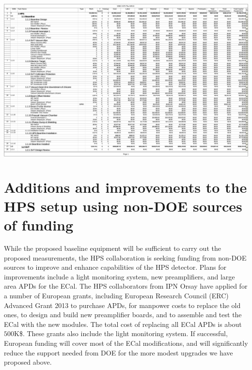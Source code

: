 \begin{center}
\includegraphics[page=9,angle=90,height=\textheight]{cost_schedule/HPSV470.pdf} 
\end{center}




\section{Additions and improvements to the HPS setup using non-DOE sources of funding}

While the proposed baseline equipment will be sufficient to carry out the proposed measurements, the HPS collaboration is 
seeking funding from non-DOE sources to improve and enhance capabilities of the HPS detector. Plans for improvements 
include a light monitoring system, new preamplifiers, and large area APDs for the ECal. The HPS collaborators from IPN Orsay have applied for 
a number of European grants, including European Research Council (ERC) Advanced Grant 2013 to purchase APDs, for 
manpower costs to replace the old ones, to design and build 
new preamplifier boards, and to assemble and test the ECal with the new modules. The total cost of replacing all ECal APDs is about $500$K\$. 
These grants also include the light monitoring system. If successful, European funding will cover most of the ECal modifications, 
and will significantly reduce the support needed from DOE for the more modest upgrades we have proposed above. 

